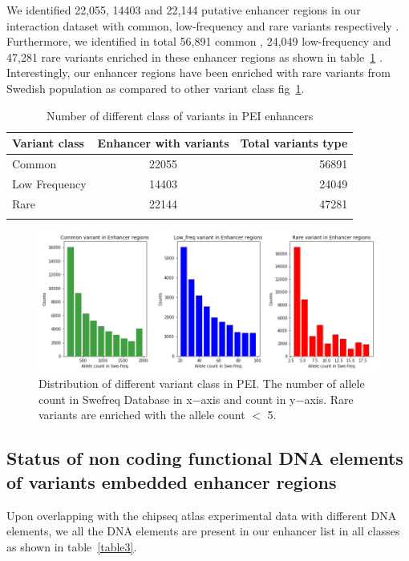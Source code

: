 \documentclass[10pt]{article} %
\begin{document}
We identified  22,055, 14403 and 22,144 putative enhancer regions in our interaction dataset with common, low-frequency and rare variants respectively . Furthermore, we identified in total 56,891 common , 24,049 low-frequency and  47,281 rare variants enriched in these enhancer regions as shown in table~\ref{table2} . Interestingly, our enhancer regions have been enriched with rare variants from Swedish population as compared to other variant class fig~\ref{fig2}.

\begin{longtable}[]{@{}lcr@{}}
\toprule
Variant class & Enhancer with variants & Total variants
type\tabularnewline
\midrule
\endhead
Common & 22055 & 56891\tabularnewline
Low Frequency & 14403 & 24049\tabularnewline
Rare & 22144 & 47281\tabularnewline
\bottomrule
\caption{\small Number of different class of variants in PEI enhancers}
\label{table2}
\end{longtable}

\begin{figure}[H]
\centering
\includegraphics[width=\textwidth]{Distibution_allelecount.png}
\caption{\small Distribution of different variant class in PEI. The number of allele count in Swefreq Database in x$-$axis and count in y$-$axis. Rare variants are enriched with the allele count $<$ 5.}
\label{fig2}
\end{figure}



\subsection{Status of non coding functional DNA elements of variants embedded enhancer regions}

Upon overlapping with the chipseq atlas experimental data with different DNA elements, we all the DNA elements are present in our enhancer list in all classes as shown in table~\ref{table3}. 
\end{document}
